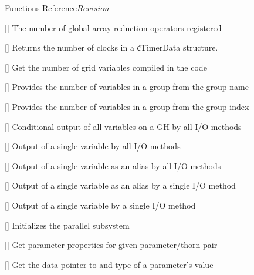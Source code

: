 \begin{cactuspart}{ Functions Reference}{}{$Revision$}
\begin{Lentry}
\item[\code{CCTK\_NumReductionArraysGloballyOperators}] [\pageref{CCTK-NumReductionArraysGloballyOperators}]
  The number of global array reduction operators registered

\item[\code{CCTK\_NumTimerClocks}] [\pageref{CCTK-NumTimerClocks}]
  Returns the number of clocks in a {\t cTimerData} structure.

\item[\code{CCTK\_NumVars}] [\pageref{CCTK-NumVars}]
  Get the number of grid variables compiled in the code

\item[\code{CCTK\_NumVarsInGroup}] [\pageref{CCTK-NumVarsInGroup}]
  Provides the number of variables in a group from the group name

\item[\code{CCTK\_NumVarsInGroupI}] [\pageref{CCTK-NumVarsInGroupI}]
  Provides the number of variables in a group from the group index

\item[\code{CCTK\_OutputGH}] [\pageref{CCTK-OutputGH}]
  Conditional output of all variables on a GH by all I/O methods

\item[\code{CCTK\_OutputVar}] [\pageref{CCTK-OutputVar}]
  Output of a single variable by all I/O methods

\item[\code{CCTK\_OutputVarAs}] [\pageref{CCTK-OutputVarAs}]
  Output of a single variable as an alias by all I/O methods

\item[\code{CCTK\_OutputVarAsByMethod}] [\pageref{CCTK-OutputVarAsByMethod}]
  Output of a single variable as an alias by a single I/O method

\item[\code{CCTK\_OutputVarByMethod}] [\pageref{CCTK-OutputVarByMethod}]
  Output of a single variable by a single I/O method

\item[\code{CCTK\_ParallelInit}] [\pageref{CCTK-ParallelInit}]
  Initializes the parallel subsystem

\item[\code{CCTK\_ParameterData}]
  [\pageref{CCTK-ParameterData}]
  Get parameter properties for given parameter/thorn pair

\item[\code{CCTK\_ParameterGet}]
  [\pageref{CCTK-ParameterGet}]
  Get the data pointer to and type of a parameter's value


\end{Lentry}
\end{cactuspart}

